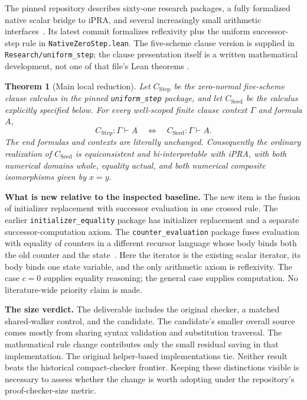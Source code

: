 \documentclass[11pt,letterpaper]{article}
\newtheorem{theorem}{Theorem}
\newcommand{\file}[1]{\nolinkurl{#1}}
\begin{document}
The pinned repository describes sixty-one research packages, a fully
formalized native scalar bridge to iPRA, and several increasingly small
arithmetic interfaces~\cite{baseline}. Its latest commit formalizes
reflexivity plus the uniform successor-step rule in
\file{NativeZeroStep.lean}. The five-scheme clause version is supplied in
\file{Research/uniform_step}; the clause presentation itself is a written
mathematical development, not one of that file's Lean theorems
\cite{nativezero,uniform}.

\begin{theorem}[Main local reduction]
Let $C_{\mathrm{Step}}$ be the zero-normal five-scheme clause calculus in
the pinned \file{uniform_step} package, and let $C_{\mathrm{Seed}}$ be the
calculus explicitly specified below. For every well-scoped finite clause
context $\Gamma$ and formula $A$,
\[
 C_{\mathrm{Step}}:\Gamma\vdash A
 \quad\Longleftrightarrow\quad
 C_{\mathrm{Seed}}:\Gamma\vdash A.
\]
The end formulas and contexts are literally unchanged. Consequently the
ordinary realization of $C_{\mathrm{Seed}}$ is equiconsistent and
bi-interpretable with iPRA, with both numerical domains whole, equality
actual, and both numerical composite isomorphisms given by $x=y$.
\end{theorem}

\textbf{What is new relative to the inspected baseline.}
The new item is the fusion of initializer replacement with successor
evaluation in one crossed rule. The earlier \file{initializer_equality}
package has initializer replacement and a separate successor-computation
axiom. The \file{counter_evaluation} package fuses evaluation with equality
of counters in a different recursor language whose body binds both the old
counter and the state~\cite{initializer,counter}. Here the iterator is the
existing scalar iterator, its body binds one state variable, and the only
arithmetic axiom is reflexivity. The case $c=0$ supplies equality reasoning;
the general case supplies computation. No literature-wide priority claim
is made.

\textbf{The size verdict.}
The deliverable includes the original checker, a matched shared-walker
control, and the candidate. The candidate's smaller overall source comes
mostly from sharing syntax validation and substitution traversal. The
mathematical rule change contributes only the small residual saving in
that implementation. The original helper-based implementations tie.
Neither result beats the historical compact-checker frontier. Keeping
these distinctions visible is necessary to assess whether the change is
worth adopting under the repository's proof-checker-size metric.
\end{document}
